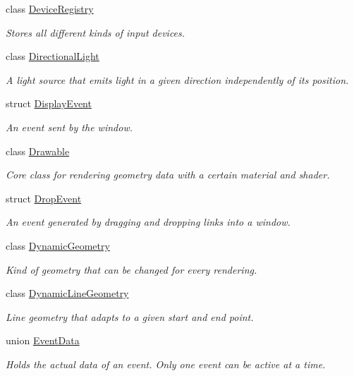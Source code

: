 \begin{DoxyCompactItemize}
class \mbox{\hyperlink{classec_1_1_device_registry}{Device\+Registry}}
\begin{DoxyCompactList}\small\item\em Stores all different kinds of input devices. \end{DoxyCompactList}\item 
class \mbox{\hyperlink{classec_1_1_directional_light}{Directional\+Light}}
\begin{DoxyCompactList}\small\item\em A light source that emits light in a given direction independently of its position. \end{DoxyCompactList}\item 
struct \mbox{\hyperlink{structec_1_1_display_event}{Display\+Event}}
\begin{DoxyCompactList}\small\item\em An event sent by the window. \end{DoxyCompactList}\item 
class \mbox{\hyperlink{classec_1_1_drawable}{Drawable}}
\begin{DoxyCompactList}\small\item\em Core class for rendering geometry data with a certain material and shader. \end{DoxyCompactList}\item 
struct \mbox{\hyperlink{structec_1_1_drop_event}{Drop\+Event}}
\begin{DoxyCompactList}\small\item\em An event generated by dragging and dropping links into a window. \end{DoxyCompactList}\item 
class \mbox{\hyperlink{classec_1_1_dynamic_geometry}{Dynamic\+Geometry}}
\begin{DoxyCompactList}\small\item\em Kind of geometry that can be changed for every rendering. \end{DoxyCompactList}\item 
class \mbox{\hyperlink{classec_1_1_dynamic_line_geometry}{Dynamic\+Line\+Geometry}}
\begin{DoxyCompactList}\small\item\em Line geometry that adapts to a given start and end point. \end{DoxyCompactList}\item 
union \mbox{\hyperlink{unionec_1_1_event_data}{Event\+Data}}
\begin{DoxyCompactList}\small\item\em Holds the actual data of an event. Only one event can be active at a time. \end{DoxyCompactList}\item 

\end{DoxyCompactItemize}
